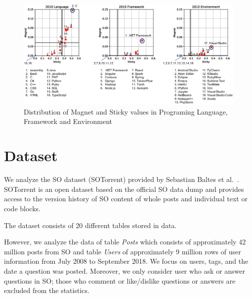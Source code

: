 \documentclass[conference]{IEEEtran}
\begin{document}
\begin{figure}[t]
 \centering
 \includegraphics[width=1.0\hsize]{img/2010allnew.eps}  
 \caption{Distribution of Magnet and Sticky values in Programing Language, Framework and Environment} 
 \label{fig:2010} 
\end{figure}


\section{Dataset}
We analyze the SO dataset (SOTorrent) provided by Sebastian Baltes et al.~\cite{msr2019challenge}. SOTorrent is an open dataset based on the official SO data dump and provides access to the version history of SO content of whole posts and individual text or code blocks.

The dataset consists of 20 different tables stored in data.

However, we analyze the data of table \emph{Posts} which consists of approximately 42 million posts from SO and table \emph{Users} of approximately 9 million rows of user information from July 2008 to September 2018. We focus on  users, tags, and the date a question was posted. Moreover, we only consider user who ask or answer questions in SO; those who comment or like/dislike questions or answers are excluded from the statistics.
\end{document}
